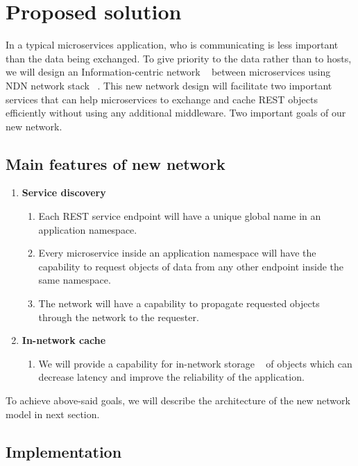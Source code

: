 \section{Proposed solution}\label{solution}

In a typical microservices application, who is communicating is less important than the data being exchanged. To give priority to the data rather than to hosts, we will design an Information-centric network ~\cite{Ahlgren} between microservices using NDN network stack ~\cite{zhang2014named}. This new network design will facilitate two important services that can help microservices to exchange and cache REST objects efficiently without using any additional middleware. Two important goals of our new network.

\subsection{Main features of new network}
 \begin{enumerate}
     \item \textbf{Service discovery}
      \begin{enumerate}
          \item Each REST service endpoint will have a unique global name in an application namespace.
            \item Every microservice inside an application namespace will have the capability to request objects of data from any other endpoint inside the same namespace.
            \item The network will have a capability to propagate requested objects through the network to the requester.
     \end{enumerate}
 
 \item \textbf{In-network cache}
   \begin{enumerate}
    \item We will provide a capability for in-network storage ~\cite{zhang2014named} of objects which can decrease latency and improve the reliability of the application. 
   \end{enumerate}
 \end{enumerate}
 
 To achieve above-said goals, we will describe the architecture of the new network model in next section.
 \subsection{Implementation}
